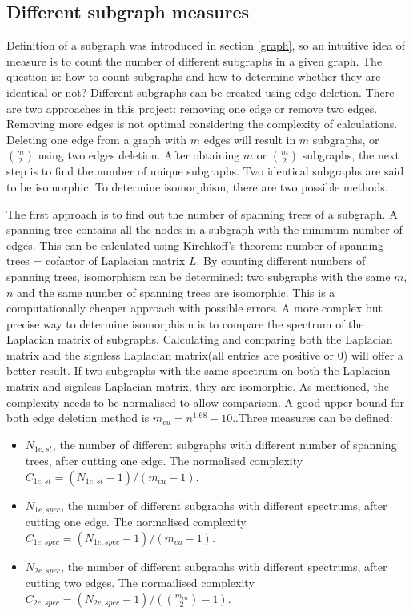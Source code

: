 \documentclass[12pt]{article}
\begin{document}
\subsection{Different subgraph measures}
Definition of a subgraph was introduced in section \ref{graph}, so an intuitive idea of measure is to count the number of different subgraphs in a given graph. The question is: how to count subgraphs and how to determine whether they are identical or not? Different subgraphs can be created using edge deletion. There are two approaches in this project: removing one edge or remove two edges. Removing more edges is not optimal considering the complexity of calculations. Deleting one edge from a graph with $m$ edges will result in $m$ subgraphs, or ${m \choose 2}$ using two edges deletion. After obtaining $m$ or ${m \choose 2}$ subgraphs, the next step is to find the number of unique subgraphs. Two identical subgraphs are said to be isomorphic. To determine isomorphism, there are two possible methods.\par
The first approach is to find out the number of spanning trees of a subgraph. A spanning tree contains all the nodes in a subgraph with the minimum number of edges. This can be calculated using Kirchkoff's theorem\cite{priezzhev1985dimer}: number of spanning trees = cofactor of Laplacian matrix $L$. By counting different numbers of spanning trees, isomorphism can be determined: two subgraphs with the same $m$, $n$ and the same number of spanning trees are isomorphic. This is a computationally cheaper approach with possible errors. A more complex but precise way to determine isomorphism is to compare the spectrum of the Laplacian matrix of subgraphs. Calculating and comparing both the Laplacian matrix and the signless Laplacian matrix(all entries are positive or 0) will offer a better result. If two subgraphs with the same spectrum on both the Laplacian matrix and signless Laplacian matrix, they are isomorphic. As mentioned, the complexity needs to be normalised to allow comparison. A good upper bound for both edge deletion method is $m_{cu}=n^{1.68}-10$.\cite{KIM20082637}.Three measures can be defined:
\begin{itemize}
    \item $N_{1e,st}$, the number of different subgraphs with different number of spanning trees, after cutting one edge. The normalised complexity $C_{1e,st} = (N_{1e,st}-1)/(m_{cu}-1)$.
    \item $N_{1e,spec}$, the number of different subgraphs with different spectrums, after cutting one edge. The normalised complexity $C_{1e,spec} = (N_{1e,spec}-1)/(m_{cu}-1)$.
    \item $N_{2e,spec}$, the number of different subgraphs with different spectrums, after cutting two edges. The normailised complexity $C_{2e,spec} = (N_{2e,spec}-1)/({m_{cu} \choose 2}-1)$.
\end{itemize}
\end{document}
